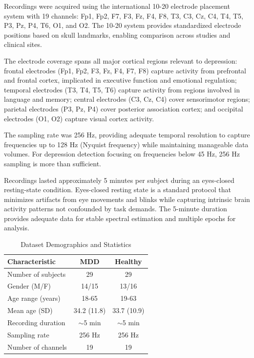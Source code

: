 \documentclass[blue,fullpaper]{ludusofficial}  %
\begin{document}
Recordings were acquired using the international 10-20 electrode placement system with 19 channels: Fp1, Fp2, F7, F3, Fz, F4, F8, T3, C3, Cz, C4, T4, T5, P3, Pz, P4, T6, O1, and O2. The 10-20 system provides standardized electrode positions based on skull landmarks, enabling comparison across studies and clinical sites.

The electrode coverage spans all major cortical regions relevant to depression: frontal electrodes (Fp1, Fp2, F3, Fz, F4, F7, F8) capture activity from prefrontal and frontal cortex, implicated in executive function and emotional regulation; temporal electrodes (T3, T4, T5, T6) capture activity from regions involved in language and memory; central electrodes (C3, Cz, C4) cover sensorimotor regions; parietal electrodes (P3, Pz, P4) cover posterior association cortex; and occipital electrodes (O1, O2) capture visual cortex activity.

The sampling rate was 256 Hz, providing adequate temporal resolution to capture frequencies up to 128 Hz (Nyquist frequency) while maintaining manageable data volumes. For depression detection focusing on frequencies below 45 Hz, 256 Hz sampling is more than sufficient.

Recordings lasted approximately 5 minutes per subject during an eyes-closed resting-state condition. Eyes-closed resting state is a standard protocol that minimizes artifacts from eye movements and blinks while capturing intrinsic brain activity patterns not confounded by task demands. The 5-minute duration provides adequate data for stable spectral estimation and multiple epochs for analysis.

\begin{table}[h!]
\centering
\caption{Dataset Demographics and Statistics}
\label{tab:demographics}
\begin{tabular}{|l|c|c|}
\hline
\textbf{Characteristic} & \textbf{MDD} & \textbf{Healthy} \\
\hline
Number of subjects & 29 & 29 \\
\hline
Gender (M/F) & 14/15 & 13/16 \\
\hline
Age range (years) & 18-65 & 19-63 \\
\hline
Mean age (SD) & 34.2 (11.8) & 33.7 (10.9) \\
\hline
Recording duration & $\sim$5 min & $\sim$5 min \\
\hline
Sampling rate & 256 Hz & 256 Hz \\
\hline
Number of channels & 19 & 19 \\
\hline
\end{tabular}
\end{table}
\end{document}
